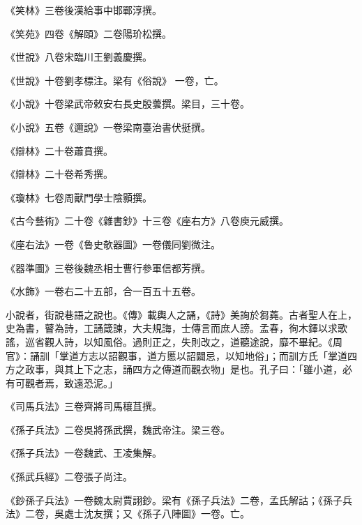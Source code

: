\begin{pinyinscope}
 《笑林》三卷後漢給事中邯鄲淳撰。



 《笑苑》四卷《解頤》二卷陽玠松撰。



 《世說》八卷宋臨川王劉義慶撰。



 《世說》十卷劉孝標注。梁有《俗說》
 一卷，亡。



 《小說》十卷梁武帝敕安右長史殷蕓撰。梁目，三十卷。



 《小說》五卷《邇說》一卷梁南臺治書伏挺撰。



 《辯林》二十卷蕭賁撰。



 《辯林》二十卷希秀撰。



 《瓊林》七卷周獸門學士陰顥撰。



 《古今藝術》二十卷《雜書鈔》十三卷《座右方》八卷庾元威撰。



 《座右法》一卷《魯史欹器圖》一卷儀同劉微注。



 《器準圖》三卷後魏丞相士曹行參軍信都芳撰。



 《水飾》一卷右二十五部，合一百五十五卷。



 小說者，街說巷語之說也。《傳》載輿人之誦，《詩》美詢於芻蕘。古者聖人在上，史為書，瞽為詩，工誦箴諫，大夫規誨，士傳言而庶人謗。孟春，徇木鐸以求歌謠，巡省觀人詩，以知風俗。過則正之，失則改之，道聽途說，靡不畢紀。《周
 官》：誦訓「掌道方志以詔觀事，道方慝以詔闢忌，以知地俗」；而訓方氏「掌道四方之政事，與其上下之志，誦四方之傳道而觀衣物」是也。孔子曰：「雖小道，必有可觀者焉，致遠恐泥。」



 《司馬兵法》三卷齊將司馬穰苴撰。



 《孫子兵法》二卷吳將孫武撰，魏武帝注。梁三卷。



 《孫子兵法》一卷魏武、王凌集解。



 《孫武兵經》二卷張子尚注。



 《鈔孫子兵法》一卷魏太尉賈詡鈔。梁有《孫子兵法》二卷，孟氏解詁；《孫子兵法》二卷，吳處士沈友撰；又《孫子八陣圖》一卷。亡。




\end{pinyinscope}
